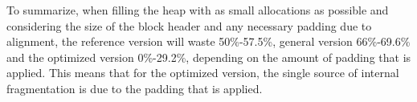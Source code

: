 To summarize, when filling the heap with as small allocations as possible and considering the size of the block header and any necessary padding due to alignment, the reference version will waste 50\%-57.5\%, general version 66\%-69.6\% and the optimized version 0\%-29.2\%, depending on the amount of padding that is applied. This means that for the optimized version, the single source of internal fragmentation is due to the padding that is applied.




















